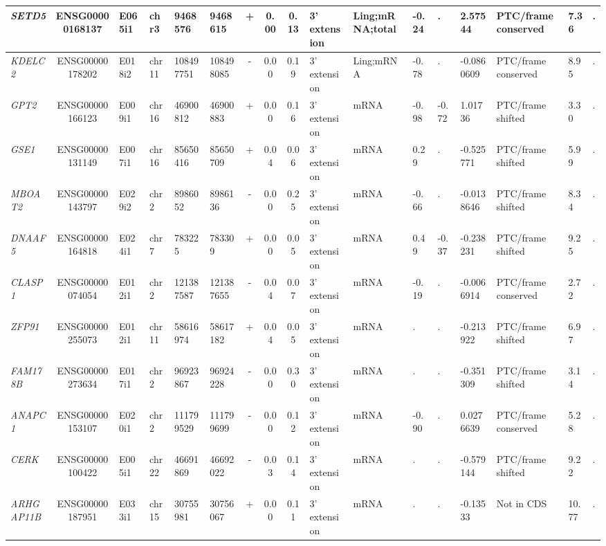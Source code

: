 \begin{landscape}
\begin{table}
{\begin{tabular}{|l|c|l|l|l|l|c|c|c|l|l|l|l|l|l|l|l|}
		\textit{SETD5} & ENSG00000168137 & E065i1 & chr3  & 9468576 & 9468615 & +     & 0.00  & 0.13  & 3' extension & Ling;mRNA;total & -0.24 & . & 2.57544 & PTC/frame conserved & 7.36  & . \\ \hline
		\textit{KDELC2} & ENSG00000178202 & E018i2 & chr11 & 108497751 & 108498085 & -     & 0.00  & 0.19  & 3' extension & Ling;mRNA & -0.78 & . & -0.0860609 & PTC/frame conserved & 8.95  & . \\ \hline
		\textit{GPT2} & ENSG00000166123 & E009i1 & chr16 & 46900812 & 46900883 & +     & 0.00  & 0.16  & 3' extension & mRNA  & -0.98 & -0.72 & 1.01736 & PTC/frame shifted & 3.30  & . \\ \hline
		\textit{GSE1} & ENSG00000131149 & E007i1 & chr16 & 85650416 & 85650709 & +     & 0.04  & 0.06  & 3' extension & mRNA  & 0.29  & . & -0.525771 & PTC/frame shifted & 5.99  & . \\ \hline
		\textit{MBOAT2} & ENSG00000143797 & E029i2 & chr2  & 8986052 & 8986136 & -     & 0.00  & 0.25  & 3' extension & mRNA  & -0.66 & . & -0.0138646 & PTC/frame shifted & 8.34  & . \\ \hline
		\textit{DNAAF5} & ENSG00000164818 & E024i1 & chr7  & 783225 & 783309 & +     & 0.00  & 0.05  & 3' extension & mRNA  & 0.49  & -0.37 & -0.238231 & PTC/frame shifted & 9.25  & . \\ \hline
		\textit{CLASP1} & ENSG00000074054 & E012i1 & chr2  & 121387587 & 121387655 & -     & 0.04  & 0.07  & 3' extension & mRNA  & -0.19 & . & -0.0066914 & PTC/frame conserved & 2.72  & . \\ \hline
		\textit{ZFP91} & ENSG00000255073 & E012i1 & chr11 & 58616974 & 58617182 & +     & 0.04  & 0.05  & 3' extension & mRNA  & . & . & -0.213922 & PTC/frame shifted & 6.97  & . \\ \hline
		\textit{FAM178B} & ENSG00000273634 & E017i1 & chr2  & 96923867 & 96924228 & -     & 0.00  & 0.30  & 3' extension & mRNA  & . & . & -0.351309 & PTC/frame shifted & 3.14  & . \\  \hline
		\textit{ANAPC1} & ENSG00000153107 & E020i1 & chr2  & 111799529 & 111799699 & -     & 0.00  & 0.12  & 3' extension & mRNA  & -0.90 & . & 0.0276639 & PTC/frame conserved & 5.28  & . \\ \hline
		\textit{CERK} & ENSG00000100422 & E005i1 & chr22 & 46691869 & 46692022 & -     & 0.03  & 0.14  & 3' extension & mRNA  & . & . & -0.579144 & PTC/frame shifted & 9.22  & . \\ \hline
		\textit{ARHGAP11B} & ENSG00000187951 & E033i1 & chr15 & 30755981 & 30756067 & +     & 0.00  & 0.11  & 3' extension & mRNA  & . & . & -0.13533 & Not in CDS     & 10.77 & . \\ \hline

\end{tabular}}
\end{table}
\end{landscape}

